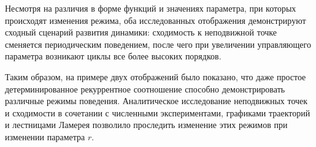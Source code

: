 \documentclass[14pt,a4paper]{extarticle}
\begin{document}
Несмотря на различия в форме функций и значениях параметра, при которых происходят изменения режима, оба исследованных отображения демонстрируют сходный сценарий развития динамики: сходимость к неподвижной точке сменяется периодическим поведением, после чего при увеличении управляющего параметра возникают циклы все более высоких порядков.

Таким образом, на примере двух отображений было показано, что даже простое детерминированное рекуррентное соотношение способно демонстрировать различные режимы поведения. Аналитическое исследование неподвижных точек и сходимости в сочетании с численными экспериментами, графиками траекторий и лестницами Ламерея позволило проследить изменение этих режимов при изменении параметра $r$.
\end{document}
